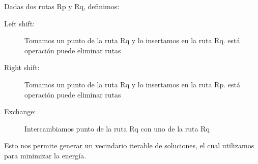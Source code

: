 Dadas dos rutas Rp y Rq, definimos:

\begin{description}
\item[Left shift:] Tomamos un punto de la ruta Rq y lo insertamos en la ruta Rq. está operación puede eliminar rutas

\item[Right shift:] Tomamos un punto de la ruta Rq y lo insertamos en la ruta Rp. está operación puede eliminar rutas

\item[Exchange:] Intercambiamos punto de la ruta Rq con uno de la ruta Rq
\end{description}

Esto nos permite generar un vecindario iterable de soluciones, el cual utilizamos para minimizar la energía.